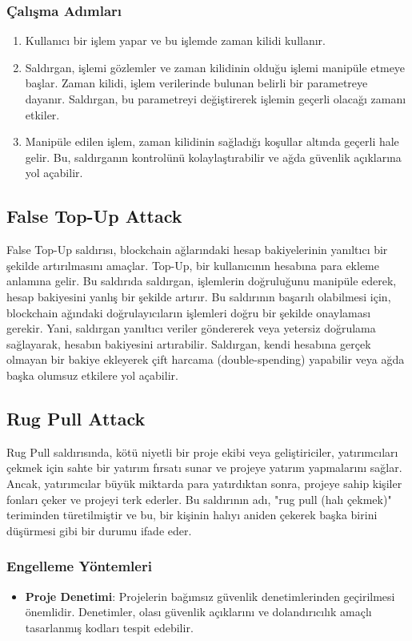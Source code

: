 \subsubsection{Çalışma Adımları}

\begin{enumerate}
    \item Kullanıcı bir işlem yapar ve bu işlemde zaman kilidi kullanır.
    \item Saldırgan, işlemi gözlemler ve zaman kilidinin olduğu işlemi manipüle etmeye başlar. Zaman kilidi, işlem verilerinde bulunan belirli bir parametreye dayanır. Saldırgan, bu parametreyi değiştirerek işlemin geçerli olacağı zamanı etkiler.
    \item Manipüle edilen işlem, zaman kilidinin sağladığı koşullar altında geçerli hale gelir. Bu, saldırganın kontrolünü kolaylaştırabilir ve ağda güvenlik açıklarına yol açabilir.
\end{enumerate}

\newpage

\subsection{False Top-Up Attack}

False Top-Up saldırısı, blockchain ağlarındaki hesap bakiyelerinin yanıltıcı bir şekilde artırılmasını amaçlar. Top-Up, bir kullanıcının hesabına para ekleme anlamına gelir. Bu saldırıda saldırgan, işlemlerin doğruluğunu manipüle ederek, hesap bakiyesini yanlış bir şekilde artırır. Bu saldırının başarılı olabilmesi için, blockchain ağındaki doğrulayıcıların işlemleri doğru bir şekilde onaylaması gerekir. Yani, saldırgan yanıltıcı veriler göndererek veya yetersiz doğrulama sağlayarak, hesabın bakiyesini artırabilir. Saldırgan, kendi hesabına gerçek olmayan bir bakiye ekleyerek çift harcama (double-spending) yapabilir veya ağda başka olumsuz etkilere yol açabilir.

\newpage

\subsection{Rug Pull Attack}

Rug Pull saldırısında, kötü niyetli bir proje ekibi veya geliştiriciler, yatırımcıları çekmek için sahte bir yatırım fırsatı sunar ve projeye yatırım yapmalarını sağlar. Ancak, yatırımcılar büyük miktarda para yatırdıktan sonra, projeye sahip kişiler fonları çeker ve projeyi terk ederler. Bu saldırının adı, "rug pull (halı çekmek)" teriminden türetilmiştir ve bu, bir kişinin halıyı aniden çekerek başka birini düşürmesi gibi bir durumu ifade eder.

\subsubsection{Engelleme Yöntemleri}

\begin{itemize}
    \item \textbf{Proje Denetimi}: Projelerin bağımsız güvenlik denetimlerinden geçirilmesi önemlidir. Denetimler, olası güvenlik açıklarını ve dolandırıcılık amaçlı tasarlanmış kodları tespit edebilir.
\end{itemize}

\newpage